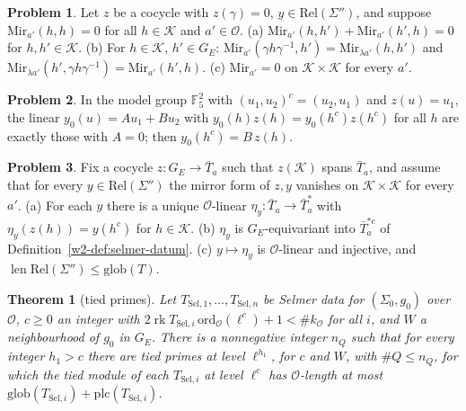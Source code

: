 \documentclass[reqno]{amsart}
\theoremstyle{definition}
\newtheorem{problem}{Problem}[section]
\theoremstyle{plain}
\newtheorem{theorem}{Theorem}[section]
\newcommand{\F}{\mathbb{F}}
\newcommand{\Oc}{\mathcal{O}}
\newcommand{\ord}{\mathrm{ord}}
\newcommand{\rk}{\operatorname{rk}}
\newcommand{\len}{\operatorname{len}}
\newcommand{\Rel}{\mathrm{Rel}}
\newcommand{\Mir}{\mathrm{Mir}}
\newcommand{\Kc}{\mathcal{K}}
\begin{document}
\begin{problem}\label{pr:polarize}
Let \(z\) be a cocycle with \(z(\gamma) = 0\), \(y \in \Rel(\Sigma'')\), and suppose \(\Mir_{a'}(h, h) = 0\) for all \(h \in \Kc\) and \(a' \in \Oc\).  \textup{(a)} \(\Mir_{a'}(h, h') + \Mir_{a'}(h', h) = 0\) for \(h, h' \in \Kc\).  \textup{(b)} For \(h \in \Kc\), \(h' \in G_E\): \(\Mir_{a'}(\gamma h\gamma^{-1}, h') = \Mir_{\lambda a'}(h, h')\) and \(\Mir_{\lambda a'}(h', \gamma h\gamma^{-1}) = \Mir_{a'}(h', h)\).  \textup{(c)} \(\Mir_{a'} = 0\) on \(\Kc \times \Kc\) for every \(a'\).
\end{problem}

\begin{problem}\label{pr:mirror-example}
In the model group \(\F_5^2\) with \((u_1, u_2)^c = (u_2, u_1)\) and \(z(u) = u_1\), the linear \(y_0(u) = Au_1 + Bu_2\) with \(y_0(h)z(h) = y_0(h^c)z(h^c)\) for all \(h\) are exactly those with \(A = 0\); then \(y_0(h^c) = B\,z(h)\).
\end{problem}

\begin{problem}\label{pr:inject}
Fix a cocycle \(z \colon G_E \to \bar T_a\) such that \(z(\Kc)\) spans \(\bar T_a\), and assume that for every \(y \in \Rel(\Sigma'')\) the mirror form of \(z, y\) vanishes on \(\Kc \times \Kc\) for every \(a'\).  \textup{(a)} For each \(y\) there is a unique \(\Oc\)-linear \(\eta_y \colon \bar T_a \to \bar T_a^{*}\) with \(\eta_y(z(h)) = y(h^c)\) for \(h \in \Kc\).  \textup{(b)} \(\eta_y\) is \(G_E\)-equivariant into \(\bar T_a^{*c}\) of Definition~\ref{w2-def:selmer-datum}.  \textup{(c)} \(y \mapsto \eta_y\) is \(\Oc\)-linear and injective, and \(\len \Rel(\Sigma'') \le \mathrm{glob}(T)\).
\end{problem}

\begin{theorem}[tied primes]\label{thm:tied}
Let \(T_{\mathrm{Sel},1}, \dots, T_{\mathrm{Sel},n}\) be Selmer data for \((\Sigma_0, g_0)\) over \(\Oc\), \(c \ge 0\) an integer with \(2\rk T_{\mathrm{Sel},i}\,\ord_{\Oc}(\ell^{c}) + 1 < \#k_{\Oc}\) for all \(i\), and \(W\) a neighbourhood of \(g_0\) in \(G_E\).  There is a nonnegative integer \(n_Q\) such that for every integer \(h_1 > c\) there are tied primes at level \(\ell^{h_1}\), for \(c\) and \(W\), with \(\#Q \le n_Q\), for which the tied module of each \(T_{\mathrm{Sel},i}\) at level \(\ell^{c}\) has \(\Oc\)-length at most \(\mathrm{glob}(T_{\mathrm{Sel},i}) + \mathrm{plc}(T_{\mathrm{Sel},i})\).
\end{theorem}
\end{document}
